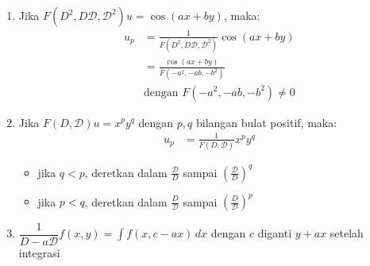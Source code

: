 \documentclass[a4paper,extrafontsizes, 9pt]{memoir}
\begin{document}
\begin{multicols}{3}
\begin{enumerate}
    \item Jika \( F(D^2, D\mathcal{D}, \mathcal{D}^2) u = \cos(ax + by) \), maka:
    \begin{align*}
        u_p &= \frac{1}{F(D^2, D\mathcal{D}, \mathcal{D}^2)} \cos(ax + by) \\
            &= \frac{\cos(ax + by)}{F(-a^2, -ab, -b^2)}  \\
            & \text{dengan } F(-a^2, -ab, -b^2) \ne 0
    \end{align*}
    
    \item Jika \( F(D, \mathcal{D}) u = x^p y^q \) dengan \( p, q \) bilangan bulat positif, maka:
    \begin{align*}
        u_p &= \frac{1}{F(D, \mathcal{D})} x^p y^q
    \end{align*}
    \begin{itemize}
        \item jika \( q < p \), deretkan dalam \( \frac{\mathcal{D}}{D} \) sampai \( \left( \frac{\mathcal{D}}{D} \right)^q \)
        \item jika \( p < q \), deretkan dalam \( \frac{D}{\mathcal{D}} \) sampai \( \left( \frac{D}{\mathcal{D}} \right)^p \)
    \end{itemize}

    \item $\dfrac{1}{D - a\mathcal{D}} f(x,y) = \int f(x, c - ax) \, dx$ dengan $c$ diganti $y + ax$ setelah integrasi

\end{enumerate}
	\end{multicols}
\end{document}
